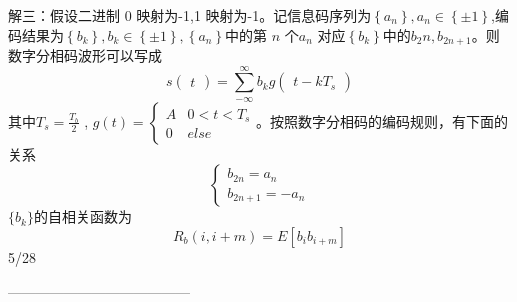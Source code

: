 \documentclass[utf8]{article}
\begin{document}
解三：假设二进制 0 映射为-1,1 映射为-1。记信息码序列为$\left\{a_n\right\},a_n\in\left\{\pm1\right\}$,编码结果为$\left\{b_{k}\right\},b_{k}\in\left\{\pm1\right\},\left\{a_{n}\right\}$中的第 $n$ 个$a_n$ 对应$\left\{b_k\right\}$中的$b_2n,b_{2n+1}$。则数字分相码波形可以写成
$$s\begin{pmatrix}t\end{pmatrix}=\sum_{-\infty}^{\infty}b_{k}g\begin{pmatrix}t-kT_{s}\end{pmatrix}$$
其中$T_s= \frac {T_b}2$ , $g\left ( t\right ) = \begin{cases} A& 0< t< T_{s}\\ 0& else \end{cases}$。按照数字分相码的编码规则，有下面的关系
$$\begin{cases}b_{2n}=a_n\\b_{2n+1}=-a_n\end{cases}$$
$\{b_k\}$的自相关函数为
$$R_b\left(i,i+m\right)=E\left[b_ib_{i+m}\right]$$
5/28

---------------------------------------
\end{document}
